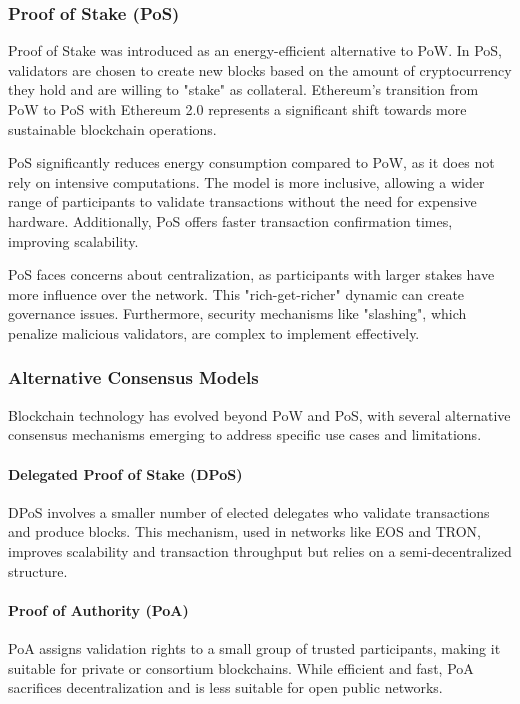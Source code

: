 \subsubsection{Proof of Stake (PoS)}

Proof of Stake was introduced as an energy-efficient alternative to PoW. In PoS, validators are chosen to create new blocks based on the amount of cryptocurrency they hold and are willing to "stake" as collateral. Ethereum’s transition from PoW to PoS with Ethereum 2.0 represents a significant shift towards more sustainable blockchain operations.

PoS significantly reduces energy consumption compared to PoW, as it does not rely on intensive computations. The model is more inclusive, allowing a wider range of participants to validate transactions without the need for expensive hardware. Additionally, PoS offers faster transaction confirmation times, improving scalability. \cite{nguyen_proof--stake_2019}

PoS faces concerns about centralization, as participants with larger stakes have more influence over the network. This "rich-get-richer" dynamic can create governance issues. Furthermore, security mechanisms like "slashing", which penalize malicious validators, are complex to implement effectively.

\subsubsection{Alternative Consensus Models}

Blockchain technology has evolved beyond PoW and PoS, with several alternative consensus mechanisms emerging to address specific use cases and limitations.

\paragraph{Delegated Proof of Stake (DPoS)}
DPoS involves a smaller number of elected delegates who validate transactions and produce blocks. This mechanism, used in networks like EOS and TRON, improves scalability and transaction throughput but relies on a semi-decentralized structure.

\paragraph{Proof of Authority (PoA)}
PoA assigns validation rights to a small group of trusted participants, making it suitable for private or consortium blockchains. While efficient and fast, PoA sacrifices decentralization and is less suitable for open public networks.

